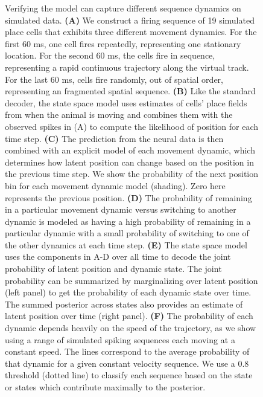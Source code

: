 \documentclass[times, twoside]{zHenriquesLab-StyleBioRxiv}
\begin{document}
\begin{figure}
\caption{Verifying the model can capture different sequence dynamics on simulated data. \textbf{(A)} We construct a firing sequence of 19 simulated place cells that exhibits three different movement dynamics. For the first 60 ms, one cell fires repeatedly, representing one stationary location. For the second 60 ms, the cells fire in sequence, representing a rapid continuous trajectory along the virtual track. For the last 60 ms, cells fire randomly, out of spatial order, representing an fragmented spatial sequence. \textbf{(B)} Like the standard decoder, the state space model uses estimates of cells' place fields from when the animal is moving and combines them with the observed spikes in (A) to compute the likelihood of position for each time step. \textbf{(C)} The prediction from the neural data is then combined with an explicit model of each movement dynamic, which determines how latent position can change based on the position in the previous time step. We show the probability of the next position bin for each movement dynamic model (shading). Zero here represents the previous position. \textbf{(D)} The probability of remaining in a particular movement dynamic versus switching to another dynamic is modeled as having a high probability of remaining in a particular dynamic with a small probability of switching to one of the other dynamics at each time step. \textbf{(E)} The state space model uses the components in A-D over all time to decode the joint probability of latent position and dynamic state. The joint probability can be summarized by marginalizing over latent position (left panel) to get the probability of each dynamic state over time. The summed posterior across states also provides an estimate of latent position over time (right panel). \textbf{(F)} The probability of each dynamic depends heavily on the speed of the trajectory, as we show using a range of simulated spiking sequences each moving at a constant speed. The lines correspond to the average probability of that dynamic for a given constant velocity sequence. We use a 0.8  threshold (dotted line) to classify each sequence based on the state or states which contribute maximally to the posterior. 
}
\label{1}
\end{figure}
\end{document}
